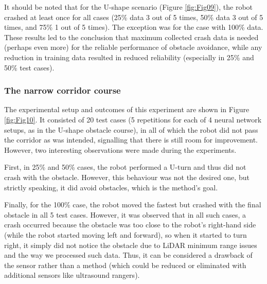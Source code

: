 It should be noted that for the U-shape scenario (Figure \ref{fig:Fig09}), the robot crashed at least once for all cases (25\% data 3 out of 5 times, 50\% data 3 out of 5 times, and 75\% 1 out of 5 times). The exception was for the case with 100\% data. These results led to the conclusion that maximum collected crash data is needed (perhaps even more) for the reliable performance of obstacle avoidance, while any reduction in training data resulted in reduced reliability (especially in 25\% and 50\% test cases).

\subsubsection{The narrow corridor course}

The experimental setup and outcomes of this experiment are shown in Figure \ref{fig:Fig10}. It consisted of 20 test cases (5 repetitions for each of 4 neural network setups, as in the U-shape obstacle course), in all of which the robot did not pass the corridor as was intended, signalling that there is still room for improvement. However, two interesting observations were made during the experiments. 

First, in 25\% and 50\% cases, the robot performed a U-turn and thus did not crash with the obstacle. However, this behaviour was not the desired one, but strictly speaking, it did avoid obstacles, which is the method's goal. 

Finally, for the 100\% case, the robot moved the fastest but crashed with the final obstacle in all 5 test cases. However, it was observed that in all such cases, a crash occurred because the obstacle was too close to the robot’s right-hand side (while the robot started moving left and forward), so when it started to turn right, it simply did not notice the obstacle due to LiDAR minimum range issues and the way we processed such data. Thus, it can be considered a drawback of the sensor rather than a method (which could be reduced or eliminated with additional sensors like ultrasound rangers).

